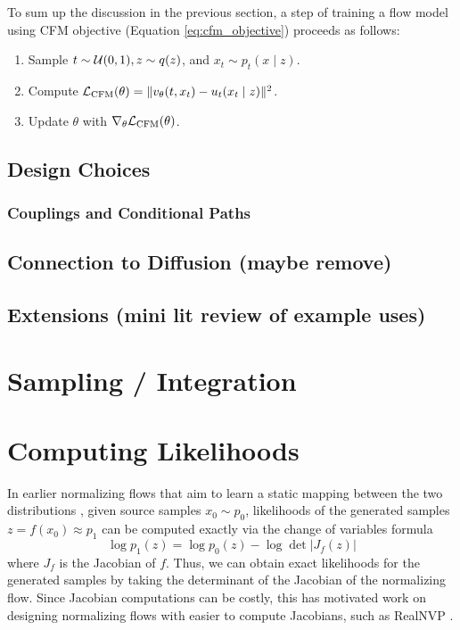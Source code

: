 To sum up the discussion in the previous section, a step of training a flow model using CFM objective (Equation \ref{eq:cfm_objective}) proceeds as follows:
\begin{enumerate}
    \item Sample $t \sim \mathcal{U}(0,1), z \sim q(z)$, and $x_t \sim p_t(x \mid z)$.
    \item Compute $\mathcal{L}_{\text{CFM}}(\theta) = \Vert v_\theta(t, x_t) - u_t(x_t \mid z) \Vert ^2$.
    \item Update $\theta$ with $\nabla_\theta \mathcal{L}_{\text{CFM}}(\theta)$.
\end{enumerate}

\subsection{Design Choices} \label{section:design_choices}

\subsubsection{Couplings and Conditional Paths}



\subsection{Connection to Diffusion (maybe remove)}

\subsection{Extensions (mini lit review of example uses)}

\section{Sampling / Integration} \label{section:sampling_integration}

\section{Computing Likelihoods} \label{section:computing_likelihoods}

In earlier normalizing flows that aim to learn a static mapping between the two distributions \citep{rezendeVariationalInferenceNormalizing2015}, given source samples $x_0 \sim p_0$, likelihoods of the generated samples $z = f(x_0) \approx p_1$  can be computed exactly via the change of variables formula
\begin{equation} \label{eq:static_cov}
    \log p_1(z) = \log p_0(z) - \log \det \left\vert J_f(z) \right\vert
\end{equation}
where $J_f$ is the Jacobian of $f$. Thus, we can obtain exact likelihoods for the generated samples by taking the determinant of the Jacobian of the normalizing flow. Since Jacobian computations can be costly, this has motivated work on designing normalizing flows with easier to compute Jacobians, such as RealNVP \citep{dinhDensityEstimationUsing2017}. 

